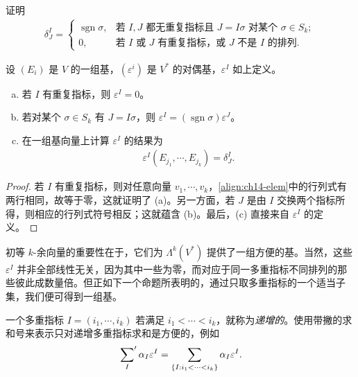 \documentclass[../../main.tex]{subfiles}
\begin{document}
\begin{exercise}\label{exercise:ch14-06}
证明
\begin{align*}
\delta^I_J=
\begin{cases}
\operatorname{sgn}\sigma,&\text{若 }I,J\text{ 都无重复指标且 }J=I\sigma\text{ 对某个 }\sigma\in S_k;\\
0,&\text{若 }I\text{ 或 }J\text{ 有重复指标，或 }J\text{ 不是 }I\text{ 的排列}.
\end{cases}
\end{align*}
\end{exercise}

\begin{lemma}[初等 $k$-余向量的性质]\label{lemma:ch14-elementary-props}
设 $(E_i)$ 是 $V$ 的一组基，$(\varepsilon^i)$ 是 $V^*$ 的对偶基，$\varepsilon^I$ 如上定义。
\begin{enumerate}[(a)]
\item 若 $I$ 有重复指标，则 $\varepsilon^I=0$。
\item 若对某个 $\sigma\in S_k$ 有 $J=I\sigma$，则 $\varepsilon^I=(\operatorname{sgn}\sigma)\varepsilon^J$。
\item 在一组基向量上计算 $\varepsilon^I$ 的结果为
\begin{align*}
\varepsilon^I(E_{j_1},\cdots ,E_{j_k})=\delta^I_J.
\end{align*}
\end{enumerate}
\end{lemma}

\begin{proof}
若 $I$ 有重复指标，则对任意向量 $v_1,\cdots ,v_k$，\eqref{align:ch14-elem}中的行列式有两行相同，故等于零，这就证明了 (a)。另一方面，若 $J$ 是由 $I$ 交换两个指标所得，则相应的行列式符号相反；这就蕴含 (b)。最后，(c) 直接来自 $\varepsilon^I$ 的定义。
\end{proof}

初等 $k$-余向量的重要性在于，它们为 $\Lambda^k(V^*)$ 提供了一组方便的基。当然，这些 $\varepsilon^I$ 并非全部线性无关，因为其中一些为零，而对应于同一多重指标不同排列的那些彼此成数量倍。但正如下一个命题所表明的，通过只取多重指标的一个适当子集，我们便可得到一组基。

一个多重指标 $I=(i_1,\cdots ,i_k)$ 若满足 $i_1<\cdots<i_k$，就称为\emph{递增的}。使用带撇的求和号来表示只对递增多重指标求和是方便的，例如
\begin{align*}
\sideset{}{'}\sum_I \alpha_I\varepsilon^I
=\sum_{\{I:i_1<\cdots<i_k\}}\alpha_I\varepsilon^I.
\end{align*}
\end{document}
